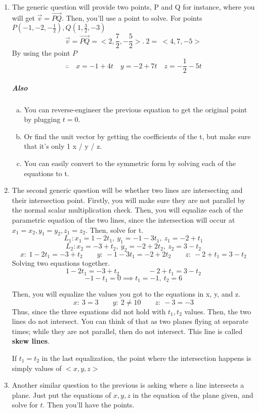 \documentclass{article}
\begin{document}
\begin{enumerate}[1.]
	\item The generic question will provide two points, P and Q for instance, where you will get $ \vec{ v } = \vec{ PQ } $. Then, you'll use a point to solve. For points $ P(-1,-2,-\frac{1}{2}), Q(1,\frac{3}{2}, -3	)$
		\[
			\vec{ v } = \vec{ PQ } = <2, \frac{7}{2}, -\frac{5}{2}> .\ 2 =\  <4,7,-5>
		\]
		By using the point $P$
		\[
			\therefore \quad x = -1+4t \quad y=-2+7t \quad z=-\frac{1}{2}-5t
		\]
		\subparagraph{Also}
		\begin{enumerate}[a.]
			\item  	You can reverse-engineer the previous equation to get the original point by plugging $t=0$.
			\item Or find  the unit vector by getting the coefficients of the t, but make sure that it's only 1 x / y / z.
			\item  You can easily convert to the symmetric form by solving each of the equations to t.
		\end{enumerate}
	\item The second generic question will be whether two lines are intersecting and their intersection point. Firstly, you will make sure they are not parallel by the normal scalar multiplication check. Then, you will equalize each of the parametric equation of the two lines, since the intersection will occur at $x_1=x_2, y_1=y_2, z_1=z_2$. Then, solve for t.
		\[
			L_1 : x_1=1-2t_1,\ y_1 = -1-3t_1,\ z_1=-2+t_1
		\]
		\[
			L_2: x_2=-3+t_2,\ y_2=-2+2t_2,\ z_2=3-t_2
		\]
		\[
			x:\ 1-2t_1 = -3+t_2 \qquad y:\ -1-3t_1=-2+2t_2 \qquad z:\ -2+t_1 = 3-t_2 
		\]
		Solving two equations together.
		\[1-2t_1=-3+t_2 \qquad	\qquad -2+t_1=3-t_2\]
		\[
			-1-t_1=0 \implies t_1=-1,\ t_2=6
		\]

		Then, you will equalize the values you got to the equations in x, y, and z.
		\[
			x:\ 3=3 \qquad y:\ 2 \neq  10 \qquad z:\ -3=-3
		\]
		Thus, since the three equations did not hold with $ t_1, t_2 $ values. Then, the two lines do not intersect. You can think of that as two planes flying at separate times; while they are not parallel, then do not intersect. This line is called \textbf{skew lines}.  

		If $t_1=t_2$ in the last equalization, the point where the intersection happens is simply values of $ <x,y,z> $ 

	\item Another similar question to the previous is asking where a line intersects a plane. Just put the equations of $x,y,z$ in the equation of the plane given, and solve for $t$. Then you'll have the points. 


\end{enumerate}
\end{document}
